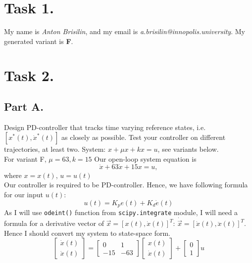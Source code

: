 \documentclass[a4paper,12pt]{article}
\begin{document}
\section{Task 1.}
My name is \textit{Anton Brisilin}, and my email is 
\textit{a.brisilin@innopolis.university}. 
My generated variant is \textbf{F}.
\section{Task 2.}
    \subsection*{Part A.}
        Design PD-controller that tracks time varying reference states, i.e.
        \\ $[x^*(t), \dot{x}^*(t)]$ as closely as possible. Test your controller on different
        trajectories, at least two. System: $x + \mu x + kx = u$, see variants below.\\
        For variant F, $\mu = 63, k = 15$
        Our open-loop system equation is 
        \begin{equation*}
            \ddot{x}+63\dot{x}+15x=u,
        \end{equation*}
        where $x=x(t)$, $u=u(t)$\\
        Our controller is required to be PD-controller. Hence, we have following formula
        for our input $u(t)$:
        \begin{equation*}
            u(t) = K_p e(t) + K_d\dot{e}(t)
        \end{equation*}
        As I will use \texttt{odeint()} function from \texttt{scipy.integrate} module,
        I will need a formula for a derivative vector of $\vec{x} = [x(t),\dot{x}(t)]^T$: 
        $\dot{\vec{x}} = [\dot{x}(t),\ddot{x}(t)]^T$. Hence I should convert my system to 
        state-space form.
        \begin{equation*}
            \begin{bmatrix}
                \dot{x}(t)\\
                \ddot{x}(t)
            \end{bmatrix}
            = 
            \begin{bmatrix}
                0 & 1 \\
                -15 & -63
            \end{bmatrix}
            \begin{bmatrix}
                x(t)\\
                \dot{x}(t)
            \end{bmatrix}
            +
            \begin{bmatrix}
                0 \\
                1
            \end{bmatrix}
            u
        \end{equation*}
\end{document}
